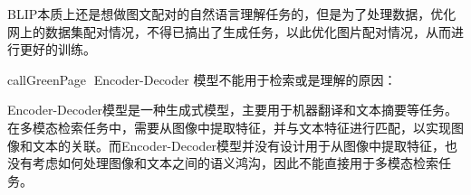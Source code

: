 \documentclass[zihao=false,fontset=windows]{ctexart}
\begin{document}
\begin{feishuquote}
BLIP本质上还是想做图文配对的自然语言理解任务的，但是为了处理数据，优化网上的数据集配对情况，不得已搞出了生成任务，以此优化图片配对情况，从而进行更好的训练。\par
\end{feishuquote}

\begin{feishubox}{callGreenPage}{🙋}
Encoder-Decoder 模型不能用于检索或是理解的原因：\par
\textcolor{feishuBlue}{Encoder-Decoder模型是一种生成式模型，主要用于机器翻译和文本摘要等任务。在多模态检索任务中，需要从图像中提取特征，并与文本特征进行匹配，以实现图像和文本的关联。而Encoder-Decoder模型并没有设计用于从图像中提取特征，也没有考虑如何处理图像和文本之间的语义鸿沟，因此不能直接用于多模态检索任务。}\par
\end{feishubox}
\end{document}
